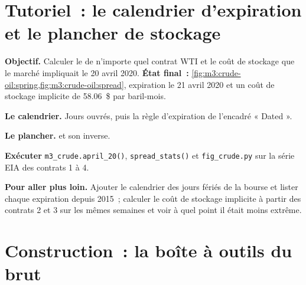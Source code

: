 \section{Tutoriel~: le calendrier d'expiration et le plancher de stockage}\label{tut:m3:crude-oil:floor}

\begin{tutorial}
\textbf{Objectif.} Calculer le  de n'importe quel contrat WTI et le coût de
stockage que le marché impliquait le 20 avril 2020. \textbf{État final~:}
\cref{fig:m3:crude-oil:spring,fig:m3:crude-oil:spread}, expiration le 21 avril 2020 et
un coût de stockage implicite de 58.06~\$ par baril-mois.
\begin{tutsteps}
\item \textbf{Le calendrier.} Jours ouvrés, puis la règle d'expiration de l'encadré « Dated ».
\label{lst:m3:crude-oil:ltd}
\item \textbf{Le plancher.}  et son inverse.
\label{lst:m3:crude-oil:floor}
\item \textbf{Exécuter} \texttt{m3\_crude.april\_20()}, \texttt{spread\_stats()} et
\texttt{fig\_crude.py} sur la série EIA des contrats 1 à 4.
\end{tutsteps}
\textbf{Pour aller plus loin.} Ajouter le calendrier des jours fériés de la bourse et lister chaque
expiration depuis 2015~; calculer le coût de stockage implicite à partir des contrats 2 et 3 sur les mêmes
semaines et voir à quel point il était moins extrême.
\end{tutorial}

\section{Construction~: la boîte à outils du brut}\label{bld:m3:crude-oil:crude}


